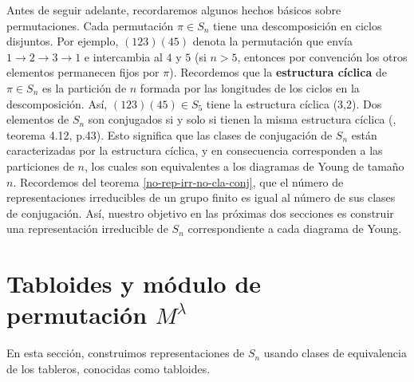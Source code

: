 \documentclass[12pt]{book}
\theoremstyle{definition}
\newcounter{in}
\newcounter{ini}
\begin{document}
Antes de seguir adelante, recordaremos algunos hechos básicos
sobre permutaciones. Cada permutación $\pi \in S_{n}$ tiene una
descomposición en ciclos disjuntos. Por ejemplo, $(123)(45)$ denota la
permutación que envía $1\rightarrow 2 \rightarrow 3 \rightarrow 1$  e
intercambia al $4$ y $5$ (si $n>5$, entonces por convención los otros
elementos permanecen fijos por $\pi$). Recordemos que la \textbf{estructura cíclica} de $\pi\in S_{n}$ es la
partición de $n$ formada por las longitudes de los ciclos en la
descomposición. Así, $(123)(45)\in S_{5}$ tiene la estructura
cíclica (3,2). Dos elementos de $S_{n}$ son conjugados si y solo si
tienen la misma estructura cíclica (\cite{zaldivar}, teorema 4.12, p.43). %
Esto significa que las clases de conjugación de $S_{n}$ están
caracterizadas por la estructura cíclica, y en consecuencia
corresponden a las particiones de $n$, los cuales son equivalentes a
los diagramas de Young de tamaño $n$. Recordemos del teorema
\ref{no-rep-irr-no-cla-conj}, que el número de representaciones irreducibles de un
grupo finito es igual al número de sus clases de conjugación. Así,
nuestro objetivo en las próximas dos secciones es construir una
representación irreducible de $S_{n}$ correspondiente a cada diagrama
de Young.

\section{Tabloides y módulo de permutación $M^{\lambda}$}
\label{modulo-permutacion}

En esta sección, construimos representaciones de $S_{n}$ usando clases
de equivalencia de los tableros, conocidas como tabloides.
\end{document}
